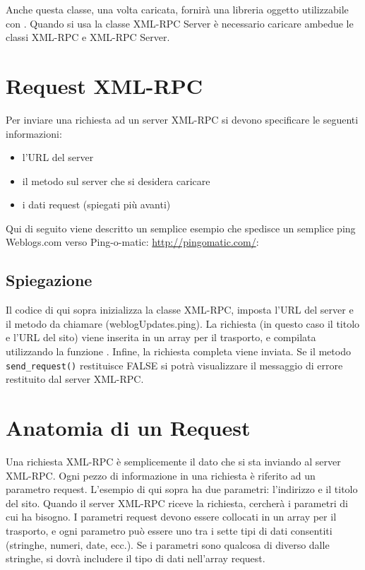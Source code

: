 Anche questa classe, una volta caricata, fornirà una libreria oggetto utilizzabile con . Quando si usa la classe XML-RPC Server è necessario caricare ambedue le classi XML-RPC e XML-RPC Server.

\section*{Request XML-RPC}
Per inviare una richiesta ad un server XML-RPC si devono specificare le seguenti informazioni:

\begin{itemize}
\item l'URL del server
\item il metodo sul server che si desidera caricare
\item i dati request (spiegati più avanti)
\end{itemize}

Qui di seguito viene descritto un semplice esempio che spedisce un semplice ping Weblogs.com verso Ping-o-matic: \url{http://pingomatic.com/}:


\subsection*{Spiegazione}
Il codice di qui sopra inizializza la classe XML-RPC, imposta l'\ac{URL} del server e il metodo da chiamare (weblogUpdates.ping). La richiesta (in questo caso il titolo e l'URL del sito) viene inserita in un array per il trasporto, e compilata utilizzando la funzione . Infine, la richiesta completa viene inviata. Se il metodo \verb|send_request()| restituisce FALSE si potrà visualizzare il messaggio di errore restituito dal server XML-RPC.

\section*{Anatomia di un Request}
Una richiesta XML-RPC è semplicemente il dato che si sta inviando al server XML-RPC. Ogni pezzo di informazione in una richiesta è riferito ad un parametro request. L'esempio di qui sopra ha due parametri: l'indirizzo e il titolo del sito. Quando il server XML-RPC riceve la richiesta, cercherà i parametri di cui ha bisogno. I parametri request devono essere collocati in un array per il trasporto, e ogni parametro può essere uno tra i sette tipi di dati consentiti (stringhe, numeri, date, ecc.). Se i parametri sono qualcosa di diverso dalle stringhe, si dovrà includere il tipo di dati nell'array request.

